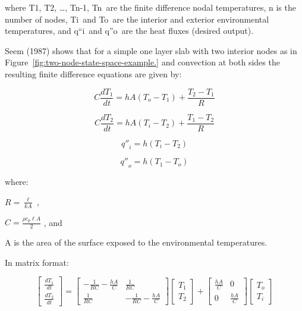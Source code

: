 where T1, T2, \ldots{}, Tn-1, Tn~are the finite difference nodal temperatures, n is the number of nodes, Ti~and To~are the interior and exterior environmental temperatures, and q``i~and q''o~are the heat fluxes (desired output).

Seem (1987) shows that for a simple one layer slab with two interior nodes as in Figure~\ref{fig:two-node-state-space-example.} and convection at both sides the resulting finite difference equations are given by:

\begin{equation}
C\frac{{d{T_1}}}{{dt}} = hA\left( {{T_o} - {T_1}} \right) + \frac{{{T_2} - {T_1}}}{R}
\end{equation}

\begin{equation}
C\frac{{d{T_2}}}{{dt}} = hA\left( {{T_i} - {T_2}} \right) + \frac{{{T_1} - {T_2}}}{R}
\end{equation}

\begin{equation}
{q''}_i = h\left( {{T_i} - {T_2}} \right)
\end{equation}

\begin{equation}
{q''}_o = h\left( {{T_1} - {T_o}} \right)
\end{equation}

where:

\(R = \frac{\ell }{{kA}}\) ,

\(C = \frac{{\rho {c_p}\ell A}}{2}\) , and

A is the area of the surface exposed to the environmental temperatures.

In matrix format:

\begin{equation}
\left[\begin{array}{c}\frac{dT_1}{dt} \\ \frac{dT_2}{dt}\end{array}\right] =
     \left[\begin{array}{cc}-\frac{1}{RC}-\frac{hA}{C} & \frac{1}{RC} \\ \frac{1}{RC} & -\frac{1}{RC}-\frac{hA}{C}\end{array}\right]\left[\begin{array}{c}T_1 \\ T_2\end{array}\right] +
     \left[\begin{array}{cc}\frac{hA}{C} & 0 \\ 0 & \frac{hA}{C}\end{array}\right]\left[\begin{array}{c}T_o \\ T_i\end{array}\right]
\end{equation}


